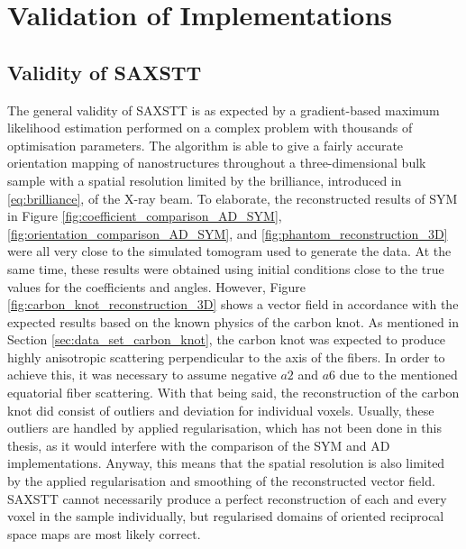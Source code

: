 \chapter{Validation of Implementations} \label{ch:validation_discussion}

\section{Validity of SAXSTT}\label{sec:validity_saxstt}
The general validity of SAXSTT is as expected by a gradient-based maximum likelihood estimation performed on a complex problem with thousands of optimisation parameters.
The algorithm is able to give a fairly accurate orientation mapping of nanostructures
throughout a three-dimensional bulk sample with a spatial resolution limited by the brilliance, introduced in \eqref{eq:brilliance}, of the X-ray beam.
To elaborate, the reconstructed results of SYM in
Figure \ref{fig:coefficient_comparison_AD_SYM},
\ref{fig:orientation_comparison_AD_SYM}, and
\ref{fig:phantom_reconstruction_3D} were all very close to the simulated tomogram used to generate the data.
At the same time, these results were obtained using initial conditions close to the true values for the coefficients and angles.
However, Figure \ref{fig:carbon_knot_reconstruction_3D} shows a vector field in accordance with the expected results based on the known physics of the carbon knot.
As mentioned in Section \ref{sec:data_set_carbon_knot}, the carbon knot was expected to produce highly anisotropic scattering perpendicular to the axis of the fibers.
In order to achieve this, it was necessary to assume negative $a2$ and $a6$ due to the mentioned equatorial fiber scattering.
With that being said, the reconstruction of the carbon knot did consist of outliers and deviation for individual voxels.
Usually, these outliers are handled by applied regularisation, which has not been done in this thesis, as it would interfere with the comparison of the SYM and AD implementations.
Anyway, this means that the spatial resolution is also limited by the applied regularisation and smoothing of the reconstructed vector field.
SAXSTT cannot necessarily produce a perfect reconstruction of each and every voxel in the sample individually,
but regularised domains of oriented reciprocal space maps are most likely correct.




